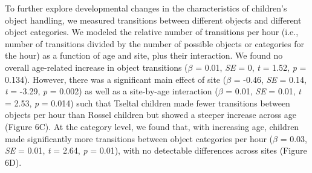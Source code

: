 \documentclass[10pt, letterpaper]{article}
\begin{document}
To further explore developmental changes in the characteristics of
children's object handling, we measured transitions between different
objects and different object categories. We modeled the relative number
of transitions per hour (i.e., number of transitions divided by the
number of possible objects or categories for the hour) as a function of
age and site, plus their interaction. We found no overall age-related
increase in object transitions (\(\beta\) = 0.01, \emph{SE} = 0,
\emph{t} = 1.52, \emph{p} = 0.134). However, there was a significant
main effect of site (\(\beta\) = -0.46, \emph{SE} = 0.14, \emph{t} =
-3.29, \emph{p} = 0.002) as well as a site-by-age interaction (\(\beta\)
= 0.01, \emph{SE} = 0.01, \emph{t} = 2.53, \emph{p} = 0.014) such that
Tseltal children made fewer transitions between objects per hour than
Rossel children but showed a steeper increase across age (Figure 6C). At
the category level, we found that, with increasing age, children made
significantly more transitions between object categories per hour
(\(\beta\) = 0.03, \emph{SE} = 0.01, \emph{t} = 2.64, \emph{p} = 0.01),
with no detectable differences across sites (Figure 6D).
\end{document}

